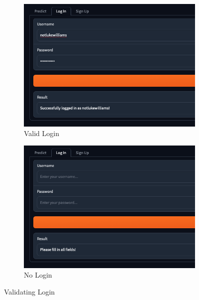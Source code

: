 \documentclass[12pt]{report}
\begin{document}
\begin{figure}[H]
\begin{subfigure}{.45\linewidth}
    \centering
    \includegraphics[width=\linewidth]{ss16.1c.png}
    \caption{Valid Login}
\end{subfigure}
\begin{subfigure}{.45\linewidth}
    \centering
    \includegraphics[width=\linewidth]{ss16.1d.png}
    \caption{No Login}
\end{subfigure}
\caption{Validating Login}\label{fig:logInValidation}
\end{figure}
\end{document}
